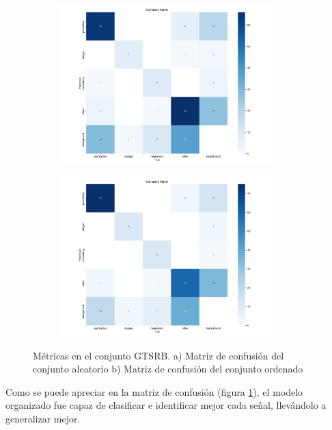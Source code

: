 \documentclass{article}
\begin{document}
\begin{figure}[h]
\begin{subfigure}[b]{0.5\textwidth}
\centering
\includegraphics[width=0.9\textwidth]{resources/random cuban confusion matrix.png}
\caption{}
\end{subfigure}
\begin{subfigure}[b]{0.5\textwidth}
\centering
\includegraphics[width=0.9\textwidth]{resources/sim cuban confusion matrix.png}
\caption{}
\end{subfigure}
\caption{Métricas en el conjunto GTSRB. a) Matriz de confusión del conjunto aleatorio b) Matriz de confusión del conjunto ordenado}
\label{fig:confusion random vs confusion sim}
\end{figure}

Como se puede apreciar en la matriz de confusión (figura \ref{fig:confusion random vs confusion sim}), el modelo organizado fue capaz de clasificar e identificar mejor cada señal, llevándolo a generalizar mejor.
\end{document}
